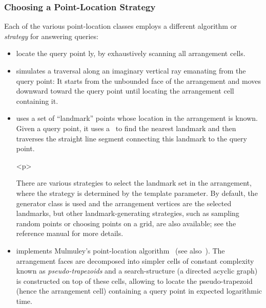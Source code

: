 \subsubsection{Choosing a Point-Location Strategy}
\label{arr_sssec:pl_strat}
%
Each of the various point-location classes employs a different
algorithm or {\em strategy} for answering queries:
\begin{itemize}
\item {} locate the query
point \naive ly, by exhaustively scanning all arrangement cells.
%
\item {}
simulates a traversal along an imaginary vertical ray emanating
from the query point: It starts from the unbounded face of the
arrangement and moves downward toward the query point until
locating the arrangement cell containing it.
%
\item {}
uses a set of ``landmark'' points whose location in the
arrangement is known. Given a query point, it uses a \kdtree\ to
find the nearest landmark and then traverses the straight line
segment connecting this landmark to the query point.

\begin{ccHtmlOnly}<p>\end{ccHtmlOnly}
There are various strategies to select the landmark set in the
arrangement, where the strategy is determined by the
 template parameter. By default, the generator
class  is used and the
arrangement vertices are the selected landmarks, but other
landmark-generating strategies, such as sampling random points or
choosing points on a grid, are also available; see the
reference manual for more details.
%
\item {} implements
Mulmuley's point-location algorithm~\cite{m-fppa-90} (see
also~\cite[Chapter~6]{bkos-cgaa-00}). The
arrangement faces are decomposed into simpler cells of constant
complexity known as {\em pseudo-trapezoids} and a search-structure
(a directed acyclic graph) is constructed on top of these cells,
allowing to locate the pseudo-trapezoid (hence the arrangement
cell) containing a query point in expected logarithmic time.
\end{itemize}

